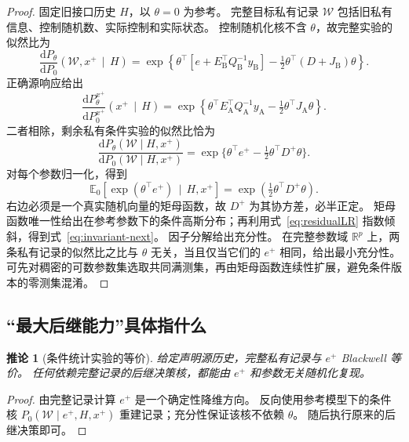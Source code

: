 \documentclass[UTF8,fontset=fandol,11pt,a4paper]{ctexart}
\newcommand{\R}{\mathbb R}
\newcommand{\E}{\mathbb E}
\newcommand{\given}{\,\mid\,}
\newcommand{\dd}{\mathrm d}
\newtheorem{corollary}[theorem]{推论}
\theoremstyle{definition}
\theoremstyle{remark}
\numberwithin{equation}{section}
\begin{document}
\begin{proof}
固定旧接口历史 $H$，以 $\theta=0$ 为参考。
完整目标私有记录 $\mathcal W$ 包括旧私有信息、控制随机数、实际控制和实际状态。
控制随机化核不含 $\theta$，故完整实验的似然比为
\begin{equation}
 \frac{\dd P_\theta}{\dd P_0}(\mathcal W,x^+\given H)
 =\exp\left\{\theta^\top
 [e+E_{\mathrm B}^\top Q_{\mathrm B}^{-1}y_{\mathrm B}]
 -\tfrac12\theta^\top(D+J_{\mathrm B})\theta\right\}.
 \label{eq:fullLR}
\end{equation}
正确源响应给出
\begin{equation}
 \frac{\dd P_\theta^{x^+}}{\dd P_0^{x^+}}(x^+\given H)
 =\exp\left\{\theta^\top E_{\mathrm A}^\top Q_{\mathrm A}^{-1}y_{\mathrm A}
 -\tfrac12\theta^\top J_{\mathrm A}\theta\right\}.
\end{equation}
二者相除，剩余私有条件实验的似然比恰为
\begin{equation}
 \frac{\dd P_\theta(\mathcal W\mid H,x^+)}
      {\dd P_0(\mathcal W\mid H,x^+)}
 =\exp\{\theta^\top e^+-\tfrac12\theta^\top D^+\theta\}.
 \label{eq:residualLR}
\end{equation}
对每个参数归一化，得到
\begin{equation}
 \E_0[\exp(\theta^\top e^+)\given H,x^+]
 =\exp(\tfrac12\theta^\top D^+\theta).
\end{equation}
右边必须是一个真实随机向量的矩母函数，故 $D^+$ 为其协方差，必半正定。
矩母函数唯一性给出在参考参数下的条件高斯分布；再利用式~\eqref{eq:residualLR} 指数倾斜，得到式~\eqref{eq:invariant-next}。
因子分解给出充分性。
在完整参数域 $\R^p$ 上，两条私有记录的似然比之比与 $\theta$ 无关，当且仅当它们的 $e^+$ 相同，给出最小充分性。
可先对稠密的可数参数集选取共同满测集，再由矩母函数连续性扩展，避免条件版本的零测集混淆。
\end{proof}

\subsection{“最大后继能力”具体指什么}
\begin{corollary}[条件统计实验的等价]
\label{cor:maximal}
给定声明源历史，完整私有记录与 $e^+$ Blackwell 等价。
任何依赖完整记录的后继决策核，都能由 $e^+$ 和参数无关随机化复现。
\end{corollary}
\begin{proof}
由完整记录计算 $e^+$ 是一个确定性降维方向。
反向使用参考模型下的条件核
$P_0(\mathcal W\mid e^+,H,x^+)$ 重建记录；充分性保证该核不依赖 $\theta$。
随后执行原来的后继决策即可。
\end{proof}
\end{document}
